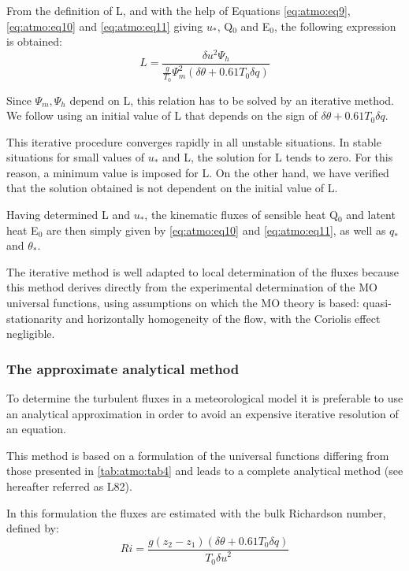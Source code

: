 From the definition of L, and with the help of Equations \eqref{eq:atmo:eq9}, \eqref{eq:atmo:eq10} and
\eqref{eq:atmo:eq11} giving $u_\ast $, Q$_{0}$ and E$_{0}$, the following
expression is obtained:
\begin{equation}
\label{eq:atmo:eq12}L=\frac{\delta u^{2} \Psi_{h}}{\frac{g}{T_{0}}\Psi_{m}^{2}(\delta {\theta}+0.61 T_{0} \delta {q})}
\end{equation}

Since $\Psi_{m}, \Psi_{h}$ depend on L, this
relation has to be solved by an iterative method. We follow \cite{Beljaars:1991}
using an initial value of L that depends on the sign of
$\delta \theta +0.61 T_{0} \delta q$.

This iterative procedure converges rapidly in all unstable situations. In
stable situations for small values of $u_{\ast}$ and L, the
solution for L tends to zero. For this reason, a minimum value is imposed
for L. On the other hand, we have verified that the solution obtained is not
dependent on the initial value of L.

Having determined L and $u_{\ast}$, the kinematic
fluxes of sensible heat Q$_{0}$ and latent heat E$_{0}$ are then simply
given by \eqref{eq:atmo:eq10} and \eqref{eq:atmo:eq11}, as well as $q_{\ast} $and
$\theta_{\ast} $.

The iterative method is well adapted to local determination of the fluxes
because this method derives directly from the experimental determination of
the MO universal functions, using assumptions on which the MO theory is
based: quasi-stationarity and horizontally homogeneity of the flow, with the
Coriolis effect negligible.

\subsubsection{The approximate analytical method}
To determine the turbulent fluxes in a meteorological model it is preferable
to use an analytical approximation in order to avoid an expensive iterative
resolution of an equation.

This method is based on a formulation of the universal functions differing
from those presented in \tablename{} \ref{tab:atmo:tab4} and leads to a complete analytical method
(see \cite{Louis:1982} hereafter referred as L82).

In this formulation the fluxes are estimated with the bulk Richardson
number, defined by:
\begin{equation}
\label{eq13}
Ri=\frac{g(z_{2} -z_{1})
({\delta \theta }
+0.61T_{0} \delta q)}
{T_{0} {\delta u}^{2}}
\end{equation}

